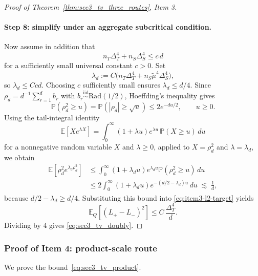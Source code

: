 \documentclass[10pt]{article}
\newcommand{\Pbb}{\mathbb P}
\newcommand{\Ebb}{\mathbb E}
\newcommand{\trg}{T}
\newcommand{\nT}{n_{\trg}}
\newcommand{\DeltaT}{\Delta_{\trg}}
\newcommand{\src}{S}
\newcommand{\nS}{n_{\src}}
\newcommand{\DeltaS}{\Delta_{\src}}
\begin{document}
\begin{proof}[Proof of Theorem~\ref{thm:sec3_tv_three_routes}, Item 3]
\paragraph{Step 8: simplify under an aggregate subcritical condition.}
Now assume in addition that
\[
    \nT\DeltaT^4+\nS\DeltaS^4\le c\,d
\]
for a sufficiently small universal constant $c>0$.  Set
\[
    \lambda_d:=C\bigl(\nT\DeltaT^4+\nS\tilde\mu^4\DeltaS^4\bigr),
\]
so $\lambda_d\le Ccd$.  Choosing $c$ sufficiently small ensures
$\lambda_d\le d/4$.  Since $\rho_d=d^{-1}\sum_{r=1}^d b_r$ with
$b_r\overset{\mathrm{iid}}{\sim}\mathrm{Rad}(1/2)$, Hoeffding's inequality gives
\[
    \Pbb(\rho_d^2\ge u)=\Pbb(|\rho_d|\ge \sqrt{u})\le 2e^{-du/2},
    \qquad u\ge 0.
\]
Using the tail-integral identity
\[
    \Ebb[Xe^{\lambda X}]
    =
    \int_0^\infty (1+\lambda u)e^{\lambda u}\,\Pbb(X\ge u)\,du
\]
for a nonnegative random variable $X$ and $\lambda\ge 0$, applied to
$X=\rho_d^2$ and $\lambda=\lambda_d$, we obtain
\begin{align*}
    \Ebb\!\left[\rho_d^2e^{\lambda_d\rho_d^2}\right]
    &\le
    \int_0^\infty (1+\lambda_d u)e^{\lambda_d u}\Pbb(\rho_d^2\ge u)\,du\\
    &\le
    2\int_0^\infty (1+\lambda_d u)e^{-(d/2-\lambda_d)u}\,du
    \;\lesssim\;
    \frac{1}{d},
\end{align*}
because $d/2-\lambda_d\ge d/4$.  Substituting this bound into
\eqref{eq:item3-l2-target} yields
\[
    \Ebb_Q[(L_+-L_-)^2]
    \le
    C\,\frac{\DeltaT^4}{d}.
\]
Dividing by $4$ gives \eqref{eq:sec3_tv_doubly}.
\end{proof}

\subsubsection{Proof of Item 4: product-scale route}

We prove the bound~\eqref{eq:sec3_tv_product}.
\end{document}
